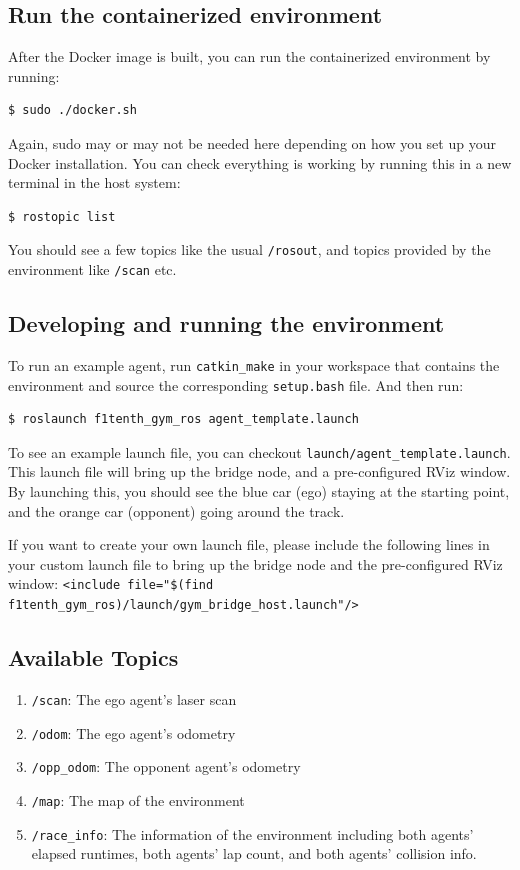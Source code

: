 \documentclass[letta4 paper]{article}
\numberwithin{equation}{section}
\newcommand{\0}{\mathbf{0}}
\begin{document}
	\subsection{Run the containerized environment}
	After the Docker image is built, you can run the containerized environment by running:
	\begin{lstlisting}[language=bash]
	$ sudo ./docker.sh
	\end{lstlisting}
	Again, sudo may or may not be needed here depending on how you set up your Docker installation. You can check everything is working by running this in a new terminal in the host system:
	\begin{lstlisting}[language=bash]
	$ rostopic list
	\end{lstlisting}
	You should see a few topics like the usual \texttt{/rosout}, and topics provided by the environment like \texttt{/scan} etc.
	
	\subsection{Developing and running the environment}
	To run an example agent, run \texttt{catkin\_make} in your workspace that contains the environment and source the corresponding \texttt{setup.bash} file. And then run:
	\begin{lstlisting}[language=bash]
	$ roslaunch f1tenth_gym_ros agent_template.launch
	\end{lstlisting}
	To see an example launch file, you can checkout \texttt{launch/agent\_template.launch}. This launch file will bring up the bridge node, and a pre-configured RViz window. By launching this, you should see the blue car (ego) staying at the starting point, and the orange car (opponent) going around the track.
	
	If you want to create your own launch file, please include the following lines in your custom launch file to bring up the bridge node and the pre-configured RViz window: \texttt{<include file="\$(find f1tenth\_gym\_ros)/launch/gym\_bridge\_host.launch"/>}

	\subsection{Available Topics}
	\begin{enumerate}
		\item \texttt{/scan}: The ego agent's laser scan
		\item \texttt{/odom}: The ego agent's odometry
		\item \texttt{/opp\_odom}: The opponent agent's odometry
		\item \texttt{/map}: The map of the environment
		\item \texttt{/race\_info}: The information of the environment including both agents' elapsed runtimes, both agents' lap count, and both agents' collision info.
	\end{enumerate}
\end{document}
